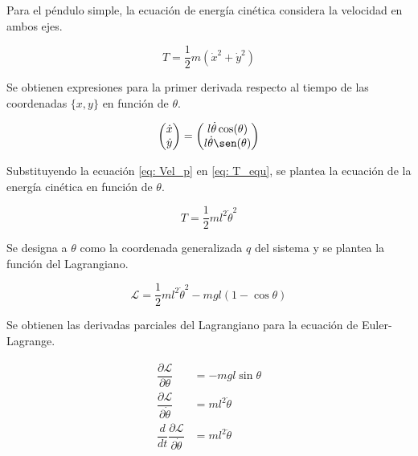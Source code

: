 Para el péndulo simple, la ecuación de energía cinética considera
la velocidad en ambos ejes.

\begin{equation} 
T = \frac{1}{2}m(\dot{x}^2 + \dot{y}^2) 
\label{eq: T_equ}
\end{equation}

Se obtienen expresiones para la primer derivada respecto al tiempo de 
las coordenadas $\{x, y\}$ en función de $\theta$.

\begin{equation} 
\begin{pmatrix}
\dot{x}\\
\dot{y}
\end{pmatrix}
= 
\begin{pmatrix}
l\dot{\theta}\cos(\theta)\\
l\dot{\theta}\sen(\theta)
\end{pmatrix}
\label{eq: Vel_p}
\end{equation}


Substituyendo la ecuación \eqref{eq: Vel_p} en \eqref{eq: T_equ}, 
se plantea la ecuación de la energía cinética en función de $\theta$.

\begin{equation}
T = \frac{1}{2}ml^2\dot{\theta}^2
\end{equation}


Se designa a $\theta$ como la coordenada generalizada $q$ del sistema y
se plantea la función del Lagrangiano.


\begin{equation}
   \mathcal L = \dfrac{1}{2}m l^2 \dot{\theta}^2 - m g l (1 - \cos{\theta})
 \label{eq: pendulum lagrangian}
\end{equation}

Se obtienen las derivadas parciales del Lagrangiano para la ecuación de 
Euler-Lagrange.

\begin{subequations}
\begin{align}
  \dfrac{\partial \mathcal L}{\partial \theta} &= - m g l \sin{\theta} \\
  \dfrac{\partial \mathcal L}{\partial \dot{\theta}} &= m l ^2 \dot{\theta}\\
  \dfrac{d}{dt}\dfrac{\partial \mathcal L}{\partial \dot{\theta}} &= ml^2\ddot{\theta}
  \end{align}
 \label{eq: partial derivatives lagrangian}
\end{subequations}


